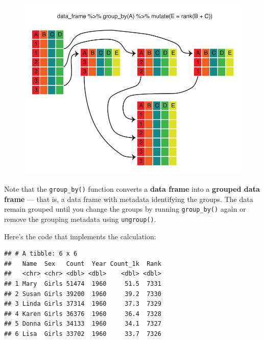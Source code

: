 \documentclass[]{book}
\newenvironment{Shaded}{\begin{snugshade}}{\end{snugshade}}
\newcommand{\KeywordTok}[1]{\textcolor[rgb]{0.13,0.29,0.53}{\textbf{#1}}}
\newcommand{\DataTypeTok}[1]{\textcolor[rgb]{0.13,0.29,0.53}{#1}}
\newcommand{\StringTok}[1]{\textcolor[rgb]{0.31,0.60,0.02}{#1}}
\newcommand{\OperatorTok}[1]{\textcolor[rgb]{0.81,0.36,0.00}{\textbf{#1}}}
\newcommand{\NormalTok}[1]{#1}
\begin{document}
\begin{figure}
\centering
\includegraphics{R/Rintro/images/mutate_group_by.png}
\caption{}
\end{figure}

Note that the \texttt{group\_by()} function converts a \textbf{data
frame} into a \textbf{grouped data frame} --- that is, a data frame with
metadata identifying the groups. The data remain grouped until you
change the groups by running \texttt{group\_by()} again or remove the
grouping metadata using \texttt{ungroup()}.

Here's the code that implements the calculation:

\begin{Shaded}
\end{Shaded}

\begin{verbatim}
## # A tibble: 6 x 6
##   Name  Sex   Count  Year Count_1k  Rank
##   <chr> <chr> <dbl> <dbl>    <dbl> <dbl>
## 1 Mary  Girls 51474  1960     51.5  7331
## 2 Susan Girls 39200  1960     39.2  7330
## 3 Linda Girls 37314  1960     37.3  7329
## 4 Karen Girls 36376  1960     36.4  7328
## 5 Donna Girls 34133  1960     34.1  7327
## 6 Lisa  Girls 33702  1960     33.7  7326
\end{verbatim}
\end{document}
